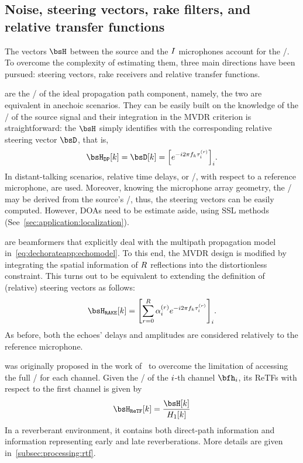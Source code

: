 \subsection{Noise, steering vectors, rake filters, and relative transfer functions}

The vectors $\FLTS$ between the source and the $I$ microphones account for the \RTFs/.
To overcome the complexity of estimating them, three main directions have been pursued: steering vectors, rake receivers and relative transfer functions.

 are the \RTFs/ of the ideal propagation path component, namely, the two are equivalent in anechoic scenarios.
They can be easily built on the knowledge of the \TOAs/ of the source signal and their integration in the \ac{MVDR} criterion is straightforward:
the $\FLTS$ simply identifies with the corresponding relative steering vector $\bsD$, that is,
\begin{equation}
    \FLTS_{\mathtt{DP}}[k] = \bsD[k] = \kbracket{ \cste^{-\csti 2 \pi f_k \tau_i^{(r)}} }_i
    .
\end{equation}
In distant-talking scenarios, relative time delays, or \TDOAs/, with respect to a reference microphone, are used.
Moreover, knowing the microphone array geometry, the \TDOAs/ may be derived from the source's \DOA/, thus, the steering vectors can be easily computed. However, \acp{DOA} need to be estimate aside, using \acf{SSL} methods (See~\cref{sec:application:localization}).

 are beamformers that explicitly deal with the multipath propagation model in~\cref{eq:dechorateapp:echomodel}.
To this end, the \ac{MVDR} design is modified by integrating the spatial information of $R$ reflections into the distortionless constraint.
This turns out to be equivalent to extending the definition of (relative) steering vectors as follows:
\begin{equation}
    \FLTS_{\mathtt{RAKE}}[k] = \kbracket{ \sum_{\idxEch=0}^{\numEchs} \alpha_{\idxMic}^{(r)} \cste^{-\csti 2 \pi f_k \tau_i^{(r)}} }_i
    .
\end{equation}
As before, both the echoes' delays and amplitudes are considered relatively to the reference microphone.

 was originally proposed in the work of~ to overcome the limitation of accessing the full \RTF/ for each channel.
Given the \RTF/ of the $i$-th channel $\bfh_\idxMic$, its \acp{ReTF} with respect to the first channel is given by
\begin{equation}
    \FLTS_{\mathtt{ReTF}}[k] = \frac{\FLTS[k]}{H_1[k]}
\end{equation}
In a reverberant environment, it contains both direct-path information and information representing early and late reverberations.
More details are given in~\cref{subsec:processing:rtf}.

